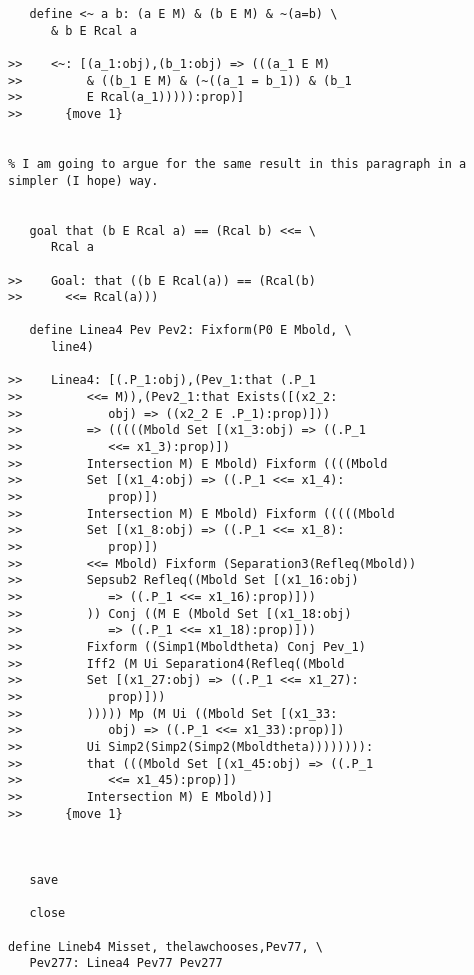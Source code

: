 \documentclass[12pt]{article}
\begin{document}
\begin{verbatim}
   define <~ a b: (a E M) & (b E M) & ~(a=b) \
      & b E Rcal a

>>    <~: [(a_1:obj),(b_1:obj) => (((a_1 E M)
>>         & ((b_1 E M) & (~((a_1 = b_1)) & (b_1
>>         E Rcal(a_1))))):prop)]
>>      {move 1}


% I am going to argue for the same result in this paragraph in a simpler (I hope) way.


   goal that (b E Rcal a) == (Rcal b) <<= \
      Rcal a

>>    Goal: that ((b E Rcal(a)) == (Rcal(b)
>>      <<= Rcal(a)))

   define Linea4 Pev Pev2: Fixform(P0 E Mbold, \
      line4)

>>    Linea4: [(.P_1:obj),(Pev_1:that (.P_1
>>         <<= M)),(Pev2_1:that Exists([(x2_2:
>>            obj) => ((x2_2 E .P_1):prop)]))
>>         => (((((Mbold Set [(x1_3:obj) => ((.P_1
>>            <<= x1_3):prop)])
>>         Intersection M) E Mbold) Fixform ((((Mbold
>>         Set [(x1_4:obj) => ((.P_1 <<= x1_4):
>>            prop)])
>>         Intersection M) E Mbold) Fixform (((((Mbold
>>         Set [(x1_8:obj) => ((.P_1 <<= x1_8):
>>            prop)])
>>         <<= Mbold) Fixform (Separation3(Refleq(Mbold))
>>         Sepsub2 Refleq((Mbold Set [(x1_16:obj)
>>            => ((.P_1 <<= x1_16):prop)]))
>>         )) Conj ((M E (Mbold Set [(x1_18:obj)
>>            => ((.P_1 <<= x1_18):prop)]))
>>         Fixform ((Simp1(Mboldtheta) Conj Pev_1)
>>         Iff2 (M Ui Separation4(Refleq((Mbold
>>         Set [(x1_27:obj) => ((.P_1 <<= x1_27):
>>            prop)]))
>>         ))))) Mp (M Ui ((Mbold Set [(x1_33:
>>            obj) => ((.P_1 <<= x1_33):prop)])
>>         Ui Simp2(Simp2(Simp2(Mboldtheta)))))))):
>>         that (((Mbold Set [(x1_45:obj) => ((.P_1
>>            <<= x1_45):prop)])
>>         Intersection M) E Mbold))]
>>      {move 1}



   save

   close

define Lineb4 Misset, thelawchooses,Pev77, \
   Pev277: Linea4 Pev77 Pev277


\end{verbatim}
\end{document}
